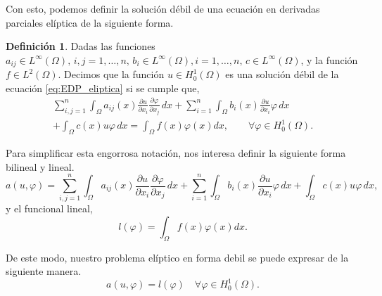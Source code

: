 \documentclass[a4paper,11pt,spanish, twoside, leqno]{tfg-uam}
\theoremstyle{definition}
\newtheorem{defin}[teor]{Definici\'on}
\begin{document}
Con esto, podemos definir la solución débil de una ecuación en derivadas parciales elíptica de la siguiente forma.
\begin{mdframed}
\begin{defin}\label{def:SolucionDebil}
    Dadas las funciones $a_{ij} \in L^\infty(\Omega), \, i,j = 1,\dots, n, \, b_i \in L^\infty(\Omega), i= 1, \dots, n, \, c\in L^\infty(\Omega)$, y la función $f\in L^2(\Omega)$. Decimos que la función $u\in H^1_0(\Omega)$ es una solución débil de la ecuación \eqref{eq:EDP_eliptica} si se cumple que, 
    \begin{equation}\label{eq:SolucionDebil}
        \begin{split}
            \sum_{i,j=1}^{n} \int_\Omega a_{ij}(x) \frac{\partial u}{\partial x_i} \frac{\partial \varphi}{\partial x_j}\,dx + \sum_{i=1}^{n} \int_\Omega b_i(x)\frac{\partial u}{\partial x_i} \varphi \,dx  \\+ \int_\Omega c(x)u \varphi \,dx = \int_\Omega f(x)\varphi(x) dx, \qquad \forall \varphi \in H^1_0(\Omega).
        \end{split}
    \end{equation}
\end{defin}
\end{mdframed}

Para simplificar esta engorrosa notación, nos interesa definir la siguiente forma bilineal y lineal. 
\begin{equation}
    a(u,\varphi) = \sum_{i,j=1}^{n} \int_\Omega a_{ij}(x) \frac{\partial u}{\partial x_i} \frac{\partial \varphi}{\partial x_j}\,dx + \sum_{i=1}^{n} \int_\Omega b_i(x)\frac{\partial u}{\partial x_i} \varphi \,dx  + \int_\Omega c(x)u \varphi \,dx,
\end{equation}
y el funcional lineal,
\begin{equation}
    l(\varphi) = \int_\Omega f(x)\varphi(x) dx.
\end{equation}

De este modo, nuestro problema elíptico en forma debil se puede expresar de la siguiente manera.
\begin{equation}
    a(u,\varphi) = l(\varphi) \quad \forall \varphi\in H^1_0(\Omega).
\end{equation}



\end{document}

